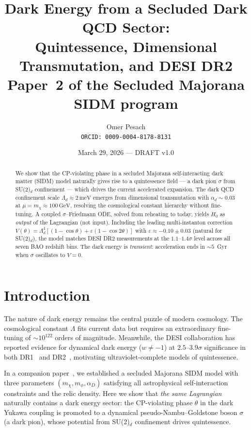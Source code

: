\documentclass[11pt,a4paper]{article}
\title{\textbf{Dark Energy from a Secluded Dark QCD Sector:\\
Quintessence, Dimensional Transmutation, and DESI DR2}\\[6pt]
\large Paper~2 of the Secluded Majorana SIDM program}
\author{Omer Pesach\\
\small \texttt{ORCID: 0009-0004-8178-8131}}
\date{March 29, 2026 --- DRAFT v1.0}
\newcommand{\Ld}{\Lambda_d}
\newcommand{\meV}{\,\mathrm{meV}}
\newcommand{\GeV}{\,\mathrm{GeV}}
\begin{document}
\maketitle

\begin{abstract}
We show that the CP-violating phase in a secluded Majorana self-interacting dark matter (SIDM) model
naturally gives rise to a quintessence field --- a dark pion $\sigma$ from SU(2)$_d$ confinement --- 
which drives the current accelerated expansion. The dark QCD confinement scale 
$\Ld \approx 2\meV$ emerges from dimensional transmutation with $\alpha_d \sim 0.03$ at 
$\mu = m_\chi \approx 100\GeV$, resolving the cosmological constant hierarchy without fine-tuning.
A coupled $\sigma$--Friedmann ODE, solved from reheating to today, yields $H_0$ as \emph{output} 
of the Lagrangian (not input). Including the leading multi-instanton correction 
$V(\theta) = \Ld^4[(1-\cos\theta) + \varepsilon(1-\cos 2\theta)]$ with 
$\varepsilon \approx -0.10 \pm 0.03$ (natural for SU(2)$_d$), the model matches DESI DR2 
measurements at the $1.1$--$1.4\sigma$ level across all seven BAO redshift bins.
The dark energy is \emph{transient}: acceleration ends in $\sim5$~Gyr when $\sigma$ oscillates to $V = 0$.
\end{abstract}

\tableofcontents
\newpage

\section{Introduction}
\label{sec:intro}

The nature of dark energy remains the central puzzle of modern cosmology.
The cosmological constant $\Lambda$ fits current data but requires an extraordinary
fine-tuning of $\sim10^{122}$ orders of magnitude. Meanwhile, the DESI collaboration
has reported evidence for dynamical dark energy ($w \neq -1$) at $2.5$--$3.9\sigma$ 
significance in both DR1~\cite{DESI_DR1} and DR2~\cite{DESI_DR2}, 
motivating ultraviolet-complete models of quintessence.

In a companion paper~\cite{paper1}, we established a secluded Majorana SIDM model with 
three parameters $(m_\chi, m_\phi, \alpha_D)$ satisfying all astrophysical self-interaction
constraints and the relic density. Here we show that \emph{the same Lagrangian} naturally 
contains a dark energy sector: the CP-violating phase $\theta$ in the dark Yukawa coupling 
is promoted to a dynamical pseudo-Nambu--Goldstone boson $\sigma$ (a dark pion), whose 
potential from SU(2)$_d$ confinement drives quintessence.
\end{document}
